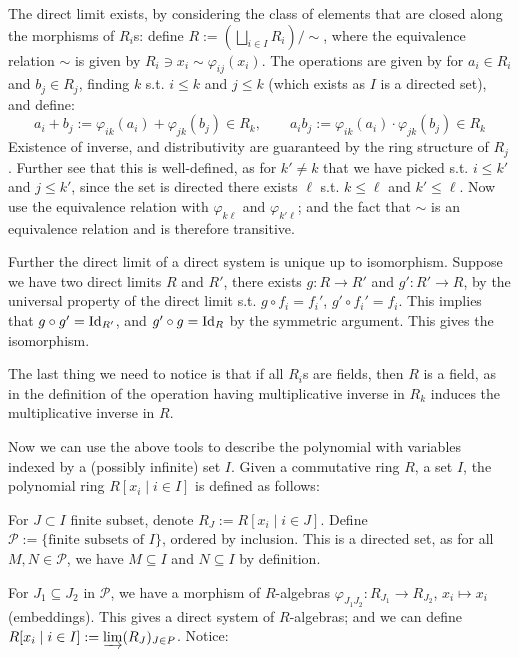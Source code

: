 \begin{parenthesis}
    The direct limit exists, by considering the class of elements that are closed along the morphisms of $R_i$s: define $R := \left(\bigsqcup_{i \in I} R_i\right)/\sim$, where the equivalence relation $\sim$ is given by $R_i \ni x_i \sim \varphi_{ij}(x_i)$. The operations are given by for $a_i \in R_i$ and $b_j \in R_j$, finding $k$ s.t. $i \leq k$ and $j \leq k$ (which exists as $I$ is a directed set), and define:
    \[
        a_i + b_j := \varphi_{ik}(a_i) + \varphi_{jk}(b_j) \in R_k, \qquad
        a_i b_j := \varphi_{ik}(a_i) \cdot \varphi_{jk}(b_j) \in R_k
    \]
    Existence of inverse, and distributivity are guaranteed by the ring structure of $R_j$. Further see that this is well-defined, as for $k' \neq k$ that we have picked s.t. $i \leq k'$ and $j \leq k'$, since the set is directed there exists $\ell$ s.t. $k \leq \ell$ and $k' \leq \ell$. Now use the equivalence relation with $\varphi_{k\ell}$ and $\varphi_{k'\ell}$; and the fact that $\sim$ is an equivalence relation and is therefore transitive. 

    Further the direct limit of a direct system is unique up to isomorphism. Suppose we have two direct limits $R$ and $R'$, there exists $g: R \to R'$ and $g': R' \to R$, by the universal property of the direct limit s.t. $g \circ f_i = f_i'$, $g' \circ f_i' = f_i$. This implies that $g \circ g' = \mathrm{Id}_{R'}$, and $g' \circ g = \mathrm{Id}_{R}$ by the symmetric argument. This gives the isomorphism.

    The last thing we need to notice is that if all $R_i$s are fields, then $R$ is a field, as in the definition of the operation having multiplicative inverse in $R_k$ induces the multiplicative inverse in $R$.
\end{parenthesis}

Now we can use the above tools to describe the polynomial with variables indexed by a (possibly infinite) set $I$. Given a commutative ring $R$, a set $I$, the polynomial ring $R[x_i \mid i \in I]$ is defined as follows:

For $J \subset I$ finite subset, denote $R_J := R[x_i \mid i \in J]$. Define $\mathcal{P} := \{\text{finite subsets of $I$}\}$, ordered by inclusion. This is a directed set, as for all $M, N \in \mathcal{P}$, we have $M \subseteq I$ and $N \subseteq I$ by definition.

For $J_1 \subseteq J_2$ in $\mathcal{P}$, we have a morphism of $R$-algebras $\varphi_{J_1 J_2}: R_{J_1} \to R_{J_2}$, $x_i \mapsto x_i$ (embeddings). This gives a direct system of $R$-algebras; and we can define $R[x_i \mid i \in I] := \varinjlim (R_J)_{J \in P}$. Notice:

